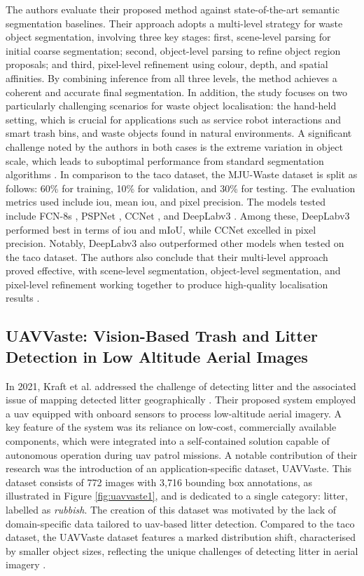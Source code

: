 The authors evaluate their proposed method against state-of-the-art semantic segmentation baselines. Their approach adopts a multi-level strategy for waste object segmentation, involving three key stages: first, scene-level parsing for initial coarse segmentation; second, object-level parsing to refine object region proposals; and third, pixel-level refinement using colour, depth, and spatial affinities. By combining inference from all three levels, the method achieves a coherent and accurate final segmentation.
In addition, the study focuses on two particularly challenging scenarios for waste object localisation: the hand-held setting, which is crucial for applications such as service robot interactions and smart trash bins, and waste objects found in natural environments. A significant challenge noted by the authors in both cases is the extreme variation in object scale, which leads to suboptimal performance from standard segmentation algorithms \cite{mju_waste}.
In comparison to the \gls{taco} dataset, the MJU-Waste dataset is split as follows: 60\% for training, 10\% for validation, and 30\% for testing. The evaluation metrics used include \gls{iou}, mean \gls{iou}, and pixel precision. The models tested include FCN-8s \cite{fcn}, PSPNet \cite{pspnet}, CCNet \cite{ccnet}, and DeepLabv3 \cite{deeplabv3}. Among these, DeepLabv3 performed best in terms of \gls{iou} and mIoU, while CCNet excelled in pixel precision. Notably, DeepLabv3 also outperformed other models when tested on the \gls{taco} dataset.
The authors also conclude that their multi-level approach proved effective, with scene-level segmentation, object-level segmentation, and pixel-level refinement working together to produce high-quality localisation results \cite{mju_waste}.

\subsection{UAVVaste: Vision-Based Trash and Litter Detection in Low Altitude Aerial Images}
\label{subsec:3_uavvaste}

In 2021, Kraft et al. addressed the challenge of detecting litter and the associated issue of mapping detected litter geographically \cite{uavvaste}. Their proposed system employed a \gls{uav} equipped with onboard sensors to process low-altitude aerial imagery. A key feature of the system was its reliance on low-cost, commercially available components, which were integrated into a self-contained solution capable of autonomous operation during \gls{uav} patrol missions.
A notable contribution of their research was the introduction of an application-specific dataset, UAVVaste. This dataset consists of 772 images with 3,716 bounding box annotations, as illustrated in Figure \ref{fig:uavvaste1}, and is dedicated to a single category: litter, labelled as \textit{rubbish}. The creation of this dataset was motivated by the lack of domain-specific data tailored to \gls{uav}-based litter detection. Compared to the \gls{taco} dataset, the UAVVaste dataset features a marked distribution shift, characterised by smaller object sizes, reflecting the unique challenges of detecting litter in aerial imagery \cite{uavvaste}.

